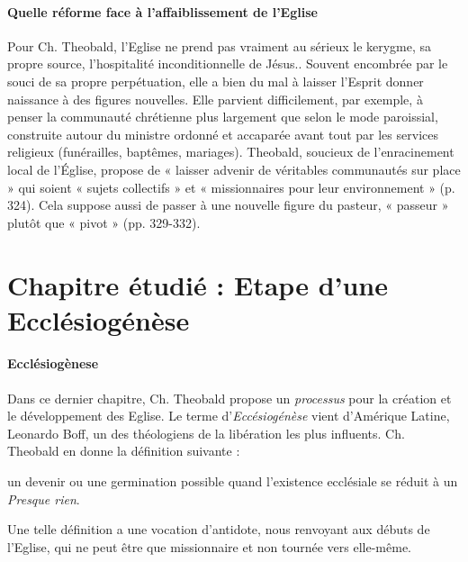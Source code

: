 \paragraph{Quelle réforme face à  l'affaiblissement de l'Eglise} Pour Ch. Theobald, 
l'Eglise ne prend pas vraiment au sérieux le kerygme, sa propre source, l'hospitalité inconditionnelle de Jésus.\cite{etienne_grieu_leglise_nodate}.
 Souvent encombrée par le souci de sa propre perpétuation, elle a bien du mal à laisser l’Esprit donner naissance à des figures nouvelles. Elle parvient difficilement, par exemple, à penser la communauté chrétienne plus largement que selon le mode paroissial, construite autour du ministre ordonné et accaparée avant tout par les services religieux (funérailles, baptêmes, mariages). Theobald, soucieux de l’enracinement local de l’Église, propose de « laisser advenir de véritables communautés sur place » qui soient « sujets collectifs » et « missionnaires pour leur environnement » (p. 324). Cela suppose aussi de passer à une nouvelle figure du pasteur, « passeur » plutôt que « pivot » (pp. 329-332).\cite{etienne_grieu_leglise_nodate}
 
 
 



\section{Chapitre étudié : Etape d'une Ecclésiogénèse}

\paragraph{Ecclésiogènese}
Dans ce dernier chapitre, Ch. Theobald propose un \textit{processus} pour la création et le développement des Eglise. 
Le terme d'\textit{Eccésiogénèse} vient d'Amérique Latine, Leonardo Boff, un des théologiens de la libération les plus influents. Ch. Theobald en donne la définition suivante : 
\begin{singlequote}
    un devenir ou une germination possible quand l'existence ecclésiale se réduit à un \textit{Presque rien}.
\end{singlequote}

Une telle définition a une vocation d'antidote, nous renvoyant aux débuts de l'Eglise, qui ne peut être que missionnaire et non tournée vers elle-même. 


